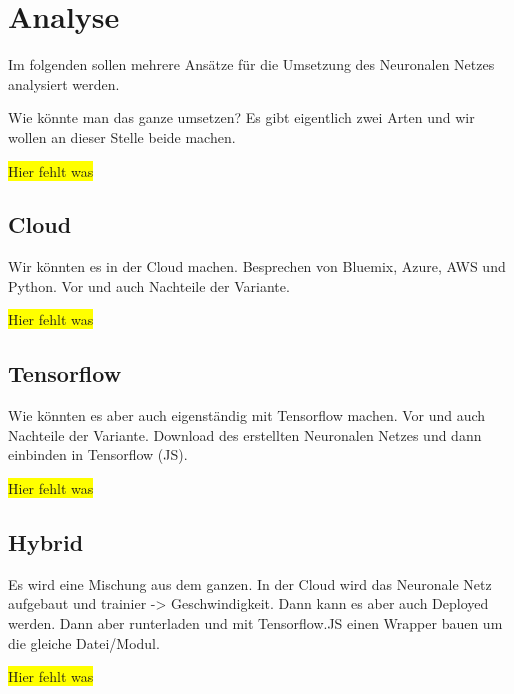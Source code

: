 \section{Analyse}
Im folgenden sollen mehrere Ansätze für die Umsetzung des Neuronalen Netzes analysiert werden.

Wie könnte man das ganze umsetzen? Es gibt eigentlich zwei Arten und wir wollen an dieser Stelle beide machen.

\colorbox{yellow}{Hier fehlt was}

\subsection{Cloud}
Wir könnten es in der Cloud machen. Besprechen von Bluemix, Azure, AWS und Python. Vor und auch Nachteile der Variante.

\colorbox{yellow}{Hier fehlt was}

\subsection{Tensorflow}
Wie könnten es aber auch eigenständig mit Tensorflow machen. Vor und auch Nachteile der Variante. Download des erstellten
Neuronalen Netzes und dann einbinden in Tensorflow (JS).

\colorbox{yellow}{Hier fehlt was}

\subsection{Hybrid}
Es wird eine Mischung aus dem ganzen. In der Cloud wird das Neuronale Netz aufgebaut und trainier -> Geschwindigkeit.
Dann kann es aber auch Deployed werden. Dann aber runterladen und mit Tensorflow.JS einen Wrapper bauen um die gleiche
Datei/Modul.

\colorbox{yellow}{Hier fehlt was}
